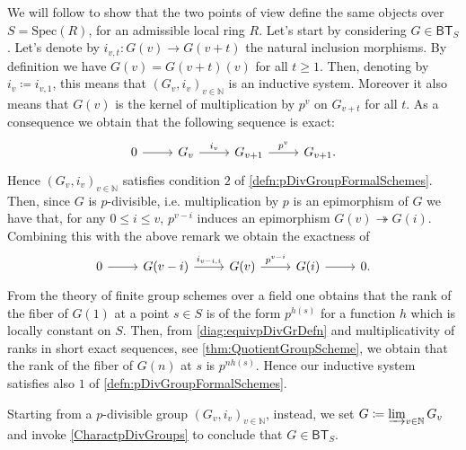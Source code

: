 \documentclass[../Main]{subfiles}
\begin{document}
\begin{rem}
	We will follow \cite[Chapter I, \S2, remark 2.3 and 
	Chapter II, \S3, theorem 2.1.7]{Messing} to show that
	the two points of view define the same objects over $S = \mathrm{Spec}(R)$,
	for an admissible local ring $R$.
	Let's start by considering $G \in \mathsf{BT}_S$.
	Let's denote by $i_{v,t}\colon G(v) \to G(v+t)$ the natural inclusion
	morphisms.
	By definition we have $G(v) = G(v+t)(v)$ for all $t \geq 1$.
	Then, denoting by $i_v \coloneqq i_{v,1}$, this means that
	$\left( G_v, i_v \right)_{v \in \mathbb{N}}$ is an inductive system.
	Moreover it also means that $G(v)$ is the kernel of multiplication
	by $p^v$ on $G_{v+t}$ for all $t$. 
	As a consequence we obtain that the following sequence is exact:
	\begin{equation*}
	\begin{tikzcd}
		0 \arrow[r, "", rightarrow] &
		G_v \arrow[r, "i_v", rightarrow] &
		G_{v+1} \arrow[r, "p^v", rightarrow] &
		G_{v+1}
	.\end{tikzcd}
	\end{equation*}
	Hence $\left( G_v, i_v \right)_{v \in \mathbb{N}}$ satisfies condition $2$
	of \cref{defn:pDivGroupFormalSchemes}.
	Then, since $G$ is $p$-divisible, i.e. multiplication by $p$ is an
	epimorphism of $G$ we have that, for any $0 \leq i \leq v$,
	$p^{v-i}$ induces an epimorphism $G(v) \twoheadrightarrow G(i)$.
	Combining this with the above remark we obtain the exactness of
	\begin{equation}\label{diag:equivpDivGrDefn}
	\begin{tikzcd}
		0 \arrow[r, "", rightarrow] &
		G(v-i) \arrow[r, "i_{v-i,i}", rightarrow] &
		G(v) \arrow[r, "p^{v-i}", rightarrow] &
		G(i) \arrow[r, "", rightarrow] &
		0
	.\end{tikzcd}
	\end{equation}
	From the theory of finite group schemes over a field one obtains that the
	rank of the fiber of $G(1)$ at a point $s \in S$ is of the form
	$p^{h(s)}$ for a function $h$ which is locally constant on $S$.
	Then, from \cref{diag:equivpDivGrDefn} and multiplicativity of
	ranks in short exact sequences, see \cref{thm:QuotientGroupScheme}, we obtain
	that the rank of the fiber of $G(n)$ at $s$
	is $p^{nh(s)}$.
	Hence our inductive system satisfies also $1$ 
	of \cref{defn:pDivGroupFormalSchemes}.

	Starting from a $p$-divisible group $\left( G_v, i_v \right)_{v \in \mathbb{N}}$,
	instead, we set $G \coloneqq \varinjlim_{v \in \mathbb{N}} G_v$
	and invoke \cref{CharactpDivGroups} to conclude that $G \in \mathsf{BT}_S$.
\end{rem}
\end{document}
